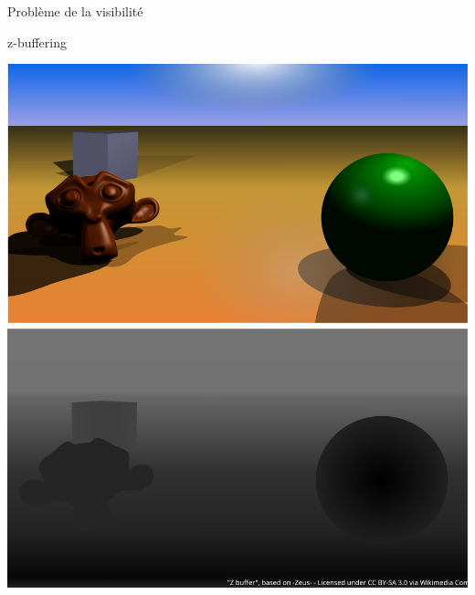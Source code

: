 \documentclass[compress]{beamer}
\begin{document}
\begin{frame}{Problème de la visibilité}
    \begin{center}
    \end{center}
\end{frame}

\begin{frame}{z-buffering}
    \begin{center}
        \includegraphics[width=0.6\linewidth]{Z_buffer}
    \end{center}
\end{frame}
\end{document}
